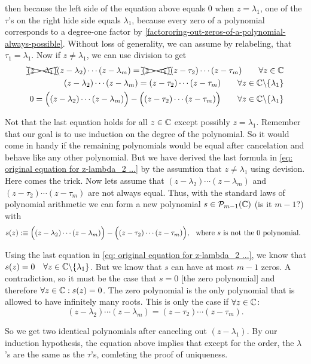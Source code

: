 \begin{prf}
  then because the left side of the equation above equals $0$ when $z=\lambda_1$, one of the $\tau$'s on the right hide side equals $\lambda_1$, because every zero of a polynomial corresponds to a degree-one factor by \ref{factororing-out-zeros-of-a-polynomial-always-possible}. Without loss of generality, we can assume by relabeling, that $\tau_1 = \lambda_1$. Now if $z \neq \lambda_1$, we can use division to get
  \begin{equation}
    \label{eq: original equation for z-lambda_2 ...}
    \begin{aligned}
      \xcancel{(z - \lambda_1)} (z - \lambda_2) \cdots (z-\lambda_m) = \xcancel{(z-\tau_1)} (z-\tau_2) \cdots (z-\tau_m) \qquad \forall z \in \mathbb{C} \\
      (z - \lambda_2) \cdots (z-\lambda_m) = (z-\tau_2) \cdots (z-\tau_m) \qquad  \forall z \in \mathbb{C} \backslash \{ \lambda_1 \} \\
      0 = \Big((z - \lambda_2) \cdots (z-\lambda_m) \Big) -   \Big((z-\tau_2) \cdots (z-\tau_m)\Big) \qquad \forall z \in \mathbb{C} \backslash \{ \lambda_1 \}
    \end{aligned}
  \end{equation}

  Not that the last equation holds for all $z \in \mathbb{C}$ except possibly $z = \lambda_1$. Remember that our goal is to use induction on the degree of the polynomial. So it would come in handy if the remaining polynomials would be equal after cancelation and behave like any other polynomial. But we have derived the last formula in \eqref{eq: original equation for z-lambda_2 ...} by the assumtion that $z \neq \lambda_1$ using devision. Here comes the trick. Now lets assume that $(z - \lambda_2) \cdots (z-\lambda_m)$ and $(z - \tau_2) \cdots (z-\tau_m)$ are not always equal. Thus, with the standard laws of polynomial arithmetic we can form a new polynomial $s \in \mathcal{P}_{m-1}(\mathbb{C})$ (is it $m-1$?) with
  \begin{equation}
    s(z) :\equiv   \Big((z - \lambda_2) \cdots (z-\lambda_m)\Big) - \Big((z-\tau_2) \cdots (z-\tau_m)\Big), \;\;\, \text{where $s$ is not the $0$ polynomial.}\;\;
  \end{equation}

   Using the last equation in \eqref{eq: original equation for z-lambda_2 ...}, we know that $s(z) = 0 \quad \forall z \in \mathbb{C} \backslash \{\lambda_1\}$. But we know that $s$ can have at most $m-1$ zeros. A contradiction, so it must be the case that $s = 0$ [the zero polynomial] and therefore $\forall z \in \mathbb{C}: s(z) = 0$. The zero polynomial is the only polynomial that is allowed to have infinitely many roots. This is only the case if $\forall z \in \mathbb{C}$:
   \[
    (z - \lambda_2) \cdots (z-\lambda_m) = (z - \tau_2) \cdots (z-\tau_m).
   \]

   So we get two identical polynomials after canceling out $(z-\lambda_1)$. By our induction hypothesis, the equation above implies that except for the order, the $\lambda$'s are the same as the $\tau$'s, comleting the proof of uniqueness.
\end{prf}


